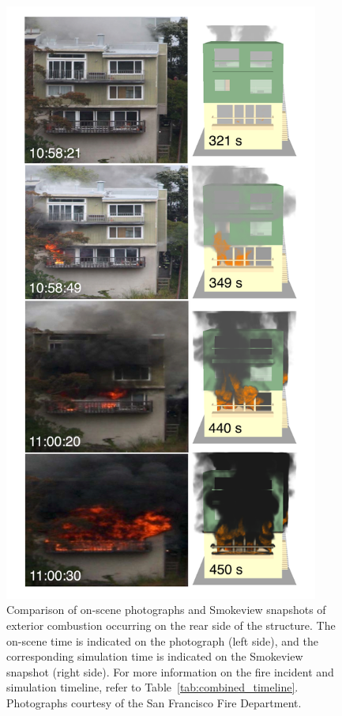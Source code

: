 \documentclass[12pt,oneside]{book}
\begin{document}
\begin{figure}[!ht]
\includegraphics[height=7.8in]{../Figures/Timeline_Comparison}
\caption[Snapshots of exterior combustion occurring on the rear side of the structure.]
{Comparison of on-scene photographs and Smokeview snapshots of exterior combustion occurring on the rear side of the structure. The on-scene time is indicated on the photograph (left side), and the corresponding simulation time is indicated on the Smokeview snapshot (right side). For more information on the fire incident and simulation timeline, refer to Table~\ref{tab:combined_timeline}. Photographs courtesy of the San Francisco Fire Department.}
\label{fig:timeline_comparison_rear}
\end{figure}
\end{document}
